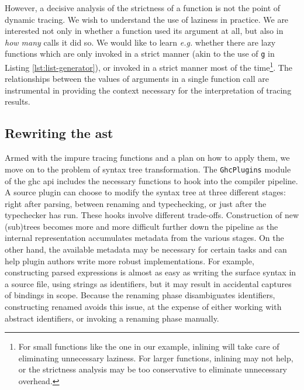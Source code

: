 \documentclass[thesis=B,english]{FITthesis}[2019/12/23]
\newcommand{\eg}{\emph{e.g.}\xspace}
\newcommand{\hsIdent}[1]{\texttt{#1}}
\newcommand{\hsModule}[1]{\texttt{#1}}
\begin{document}
However, a decisive analysis of the strictness of a function is not the point
of dynamic tracing. We wish to understand the use of laziness in practice. We
are interested not only in whether a function used its argument at all, but
also in \textit{how many} calls it did so. We would like to learn \eg whether
there are lazy functions which are only invoked in a strict manner (akin to the
use of \hsIdent{g} in Listing \ref{lst:list-generator}), or invoked in a strict
manner most of the time\footnote{
	For small functions like the one in our example, inlining will take care of
	eliminating unnecessary laziness. For larger functions, inlining may not
	help, or the strictness analysis may be too conservative to eliminate
	unnecessary overhead.
}. The relationships between the values of arguments in a single function call
are instrumental in providing the context necessary for the interpretation of
tracing results.

\subsection*{Rewriting the \acrshort{ast}}
Armed with the impure tracing functions and a plan on how to apply them, we
move on to the problem of syntax tree transformation. The \hsModule{GhcPlugins}
module~\cite{hkg-ghcplugins} of the \acrshort{ghc} \acrshort{api} includes the
necessary functions to hook into the compiler pipeline. A source plugin can
choose to modify the syntax tree at three different stages: right after
parsing, between renaming and typechecking, or just after the typechecker has
run. These hooks involve different trade-offs. Construction of new (sub)trees
becomes more and more difficult further down the pipeline as the internal
representation accumulates metadata from the various stages. On the other hand,
the available metadata may be necessary for certain tasks and can help plugin
authors write more robust implementations. For example, constructing parsed
expressions is almost as easy as writing the surface syntax in a source file,
using strings as identifiers, but it may result in accidental captures of
bindings in scope. Because the renaming phase disambiguates identifiers,
constructing renamed  avoids this issue, at the expense of
either working with abstract identifiers, or invoking a renaming phase
manually.
\end{document}
